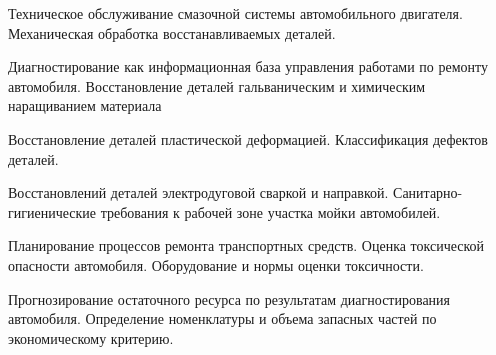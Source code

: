 \documentclass[
	14pt,
	a4paper,
	]
	{scrartcl}
\begin{document}
\vfill

\newpage


\shapk
{}
\setcounter{zad}{0}

\vfill
\z Техническое обслуживание смазочной системы автомобильного двигателя.
 \vfill
\z Механическая обработка восстанавливаемых деталей.
 \vfill

\vfill

\newpage


\shapk
{}
\setcounter{zad}{0}

\vfill
\z Диагностирование как информационная база управления работами по ремонту автомобиля.
 \vfill
\z Восстановление деталей гальваническим и химическим наращиванием материала 
 \vfill

\vfill

\newpage


\shapk
{}
\setcounter{zad}{0}

\vfill
\z Восстановление деталей пластической деформацией.
 \vfill
\z Классификация дефектов деталей.
 \vfill

\vfill

\newpage


\shapk
{}
\setcounter{zad}{0}

\vfill
\z Восстановлений деталей электродуговой сваркой и направкой.
 \vfill
\z Санитарно-гигиенические требования к рабочей зоне участка мойки автомобилей.
 \vfill

\vfill

\newpage


\shapk
{}
\setcounter{zad}{0}

\vfill
\z Планирование процессов ремонта транспортных средств.
 \vfill
\z Оценка токсической опасности автомобиля. Оборудование и нормы оценки токсичности.
 \vfill

\vfill

\newpage


\shapk
{}
\setcounter{zad}{0}

\vfill
\z Прогнозирование остаточного ресурса по результатам диагностирования автомобиля.
 \vfill
\z Определение номенклатуры и объема запасных частей по экономическому критерию.
 \vfill

\vfill

\newpage
\end{document}
